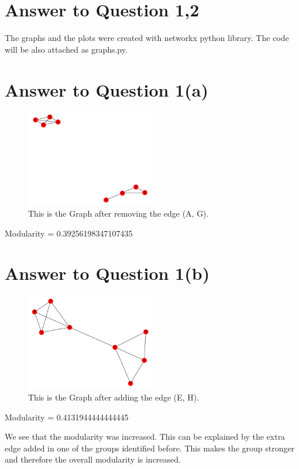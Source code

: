 \documentclass[11pt]{article}
\begin{document}
\pagebreak[4]
\section*{Answer to Question 1,2}
The graphs and the plots were created with networkx python library. The code will be also attached as graphs.py.
\section*{Answer to Question 1(a)}
\begin{figure}[h]
\caption{This is the Graph after removing the edge (A, G).}
\centering
\includegraphics[width=0.5\textwidth]{./figures/G_a}
\end{figure}
Modularity =  0.39256198347107435

\section*{Answer to Question 1(b)}
\begin{figure}[h]
\caption{This is the Graph after adding the edge (E, H).}
\centering
\includegraphics[width=0.5\textwidth]{./figures/G_b}
\end{figure}
Modularity = 0.4131944444444445

We see that the modularity was increased. This can be explained by the extra edge added in one of the groups identified before. This makes the group stronger and therefore the overall modularity is increased.
\end{document}
